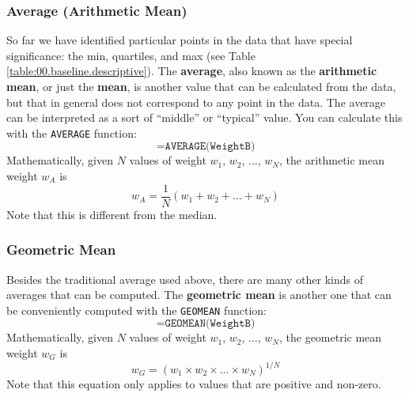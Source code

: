 \subsubsection{Average (Arithmetic Mean)}
So far we have identified particular points in the data that have special significance: the min, quartiles, and max (see Table \ref{table:00.baseline.descriptive}). The \textbf{average}, also known as the \textbf{arithmetic mean}, or just the \textbf{mean}, is another value that can be calculated from the data, but that in general does not correspond to any point in the data. The average can be interpreted as a sort of ``middle'' or ``typical'' value. You can calculate this with the \texttt{AVERAGE} function:
\begin{equation}
    \texttt{=AVERAGE(WeightB)}
\end{equation}
Mathematically, given $N$ values of weight $w_{1}$, $w_{2}$, ..., $w_{N}$, the arithmetic mean weight $w_{A}$ is
\begin{equation}
    w_{A} = \frac{1}{N} \left( w_{1} + w_{2} + ... + w_{N} \right)
\end{equation}
Note that this is different from the median.
\begin{center}
\end{center}
\subsubsection{Geometric Mean}
Besides the traditional average used above, there are many other kinds of averages that can be computed. The \textbf{geometric mean} is another one that can be conveniently computed with the \texttt{GEOMEAN} function:
\begin{equation}
    \texttt{=GEOMEAN(WeightB)}
\end{equation}
Mathematically, given $N$ values of weight $w_{1}$, $w_{2}$, ..., $w_{N}$, the geometric mean weight $w_{G}$ is
\begin{equation}
    w_{G} = \left( w_{1} \times w_{2} \times ... \times w_{N} \right)^{1/N}
\end{equation}
Note that this equation only applies to values that are positive and non-zero.

